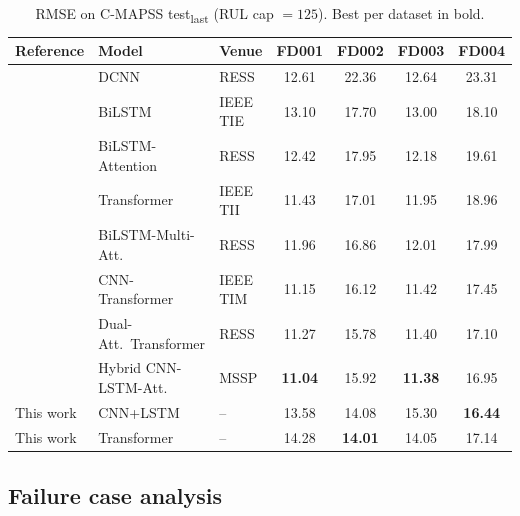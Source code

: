 \documentclass[5p,times,authoryear]{elsarticle}
\begin{document}
\begin{table}[!t]
\centering
\caption{RMSE on C-MAPSS test\textsubscript{last} (RUL cap $=125$). Best per dataset in bold.}
\label{tab:sota}
\small
\begin{tabular}{lllcccc}
\toprule
Reference & Model & Venue & FD001 & FD002 & FD003 & FD004 \\
\midrule
\citet{li2018remaining}    & DCNN                     & RESS    & 12.61 & 22.36 & 12.64 & 23.31 \\
\citet{zhang2019bilstm}    & BiLSTM                   & IEEE TIE & 13.10 & 17.70 & 13.00 & 18.10 \\
\citet{chen2020machine}    & BiLSTM-Attention         & RESS    & 12.42 & 17.95 & 12.18 & 19.61 \\
\citet{zhu2021transformer} & Transformer              & IEEE TII & 11.43 & 17.01 & 11.95 & 18.96 \\
\citet{mo2022remaining}    & BiLSTM-Multi-Att.        & RESS    & 11.96 & 16.86 & 12.01 & 17.99 \\
\citet{song2023cnntrf}     & CNN-Transformer          & IEEE TIM & 11.15 & 16.12 & 11.42 & 17.45 \\
\citet{liu2023dual}        & Dual-Att.\ Transformer   & RESS    & 11.27 & 15.78 & 11.40 & 17.10 \\
\citet{wang2024hybrid}     & Hybrid CNN-LSTM-Att.     & MSSP    & \textbf{11.04} & 15.92 & \textbf{11.38} & 16.95 \\
\midrule
This work                  & CNN+LSTM                 & --      & 13.58 & 14.08 & 15.30 & \textbf{16.44} \\
This work                  & Transformer              & --      & 14.28 & \textbf{14.01} & 14.05 & 17.14 \\
\bottomrule
\end{tabular}
\end{table}

\subsection{Failure case analysis}\label{sec:results-failure}
\end{document}
